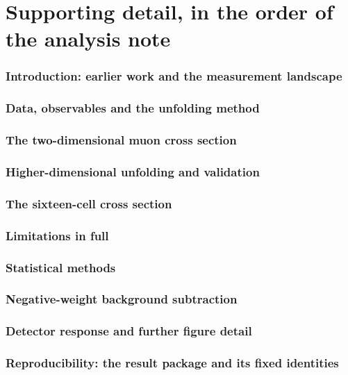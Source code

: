 \documentclass[11pt]{article}
\begin{document}
\part{Supporting detail, in the order of the analysis note}
\section{Introduction: earlier work and the measurement landscape}\label{recsec:intro}

\section{Data, observables and the unfolding method}\label{recsec:method}

\section{The two-dimensional muon cross section}\label{recsec:twod}

\section{Higher-dimensional unfolding and validation}\label{recsec:higherdim}

\section{The sixteen-cell cross section}\label{recsec:sixteen}

\section{Limitations in full}\label{recsec:limitations}

\section{Statistical methods}\label{recsec:methods}

\section{Negative-weight background subtraction}\label{recsec:negweight}

\section{Detector response and further figure detail}\label{recsec:supplementary}

\section{Reproducibility: the result package and its fixed identities}\label{recsec:repro}

\end{document}

